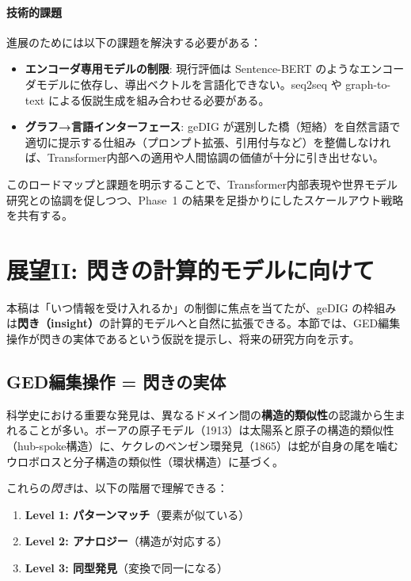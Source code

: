 \documentclass[ja=standard,xelatex]{bxjsarticle}
\begin{document}
\paragraph{技術的課題}
進展のためには以下の課題を解決する必要がある：
\begin{itemize}[leftmargin=1.8em]
  \item \textbf{エンコーダ専用モデルの制限}: 現行評価は Sentence-BERT のようなエンコーダモデルに依存し、導出ベクトルを言語化できない。seq2seq や graph-to-text による仮説生成を組み合わせる必要がある。
  \item \textbf{グラフ→言語インターフェース}: geDIG が選別した橋（短絡）を自然言語で適切に提示する仕組み（プロンプト拡張、引用付与など）を整備しなければ、Transformer内部への適用や人間協調の価値が十分に引き出せない。
\end{itemize}

\noindent このロードマップと課題を明示することで、Transformer内部表現や世界モデル研究との協調を促しつつ、Phase~1 の結果を足掛かりにしたスケールアウト戦略を共有する。

\section{展望II: 閃きの計算的モデルに向けて}
\label{sec:insight_model}

本稿は「いつ情報を受け入れるか」の制御に焦点を当てたが、geDIG の枠組みは\textbf{閃き（insight）}の計算的モデルへと自然に拡張できる。本節では、GED編集操作が閃きの実体であるという仮説を提示し、将来の研究方向を示す。

\subsection{GED編集操作 = 閃きの実体}

科学史における重要な発見は、異なるドメイン間の\textbf{構造的類似性}の認識から生まれることが多い。ボーアの原子モデル（1913）は太陽系と原子の構造的類似性（hub-spoke構造）に、ケクレのベンゼン環発見（1865）は蛇が自身の尾を噛むウロボロスと分子構造の類似性（環状構造）に基づく。

これらの\emph{閃き}は、以下の階層で理解できる：
\begin{enumerate}[leftmargin=1.8em]
  \item \textbf{Level 1: パターンマッチ}（要素が似ている）
  \item \textbf{Level 2: アナロジー}（構造が対応する）
  \item \textbf{Level 3: 同型発見}（変換で同一になる）
\end{enumerate}
\end{document}
